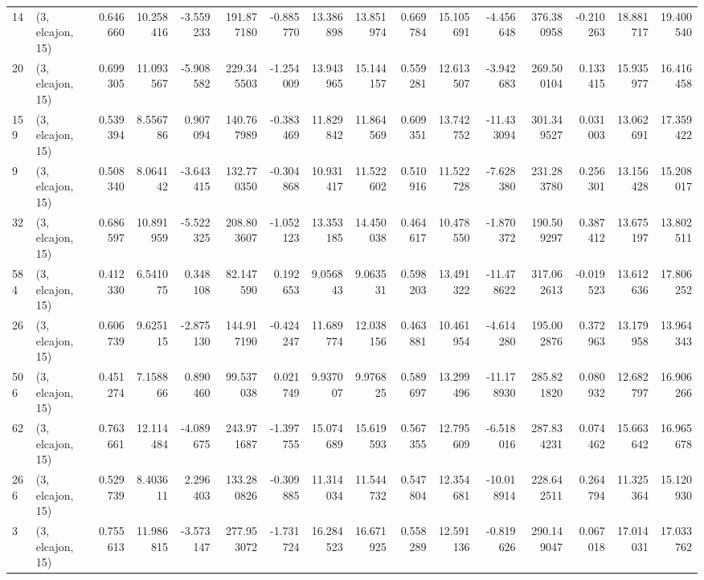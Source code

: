 \begin{tabular}{llrrrrrrrrrrrrrr}
14  &  (3, elcajon, 15) &   0.646660 &  10.258416 &  -3.559233 &   191.877180 &  -0.885770 &  13.386898 &  13.851974 &  0.669784 &  15.105691 &  -4.456648 &   376.380958 & -0.210263 &  18.881717 &  19.400540 \\
20  &  (3, elcajon, 15) &   0.699305 &  11.093567 &  -5.908582 &   229.345503 &  -1.254009 &  13.943965 &  15.144157 &  0.559281 &  12.613507 &  -3.942683 &   269.500104 &  0.133415 &  15.935977 &  16.416458 \\
159 &  (3, elcajon, 15) &   0.539394 &   8.556786 &   0.907094 &   140.767989 &  -0.383469 &  11.829842 &  11.864569 &  0.609351 &  13.742752 & -11.433094 &   301.349527 &  0.031003 &  13.062691 &  17.359422 \\
9   &  (3, elcajon, 15) &   0.508340 &   8.064142 &  -3.643415 &   132.770350 &  -0.304868 &  10.931417 &  11.522602 &  0.510916 &  11.522728 &  -7.628380 &   231.283780 &  0.256301 &  13.156428 &  15.208017 \\
32  &  (3, elcajon, 15) &   0.686597 &  10.891959 &  -5.522325 &   208.803607 &  -1.052123 &  13.353185 &  14.450038 &  0.464617 &  10.478550 &  -1.870372 &   190.509297 &  0.387412 &  13.675197 &  13.802511 \\
584 &  (3, elcajon, 15) &   0.412330 &   6.541075 &   0.348108 &    82.147590 &   0.192653 &   9.056843 &   9.063531 &  0.598203 &  13.491322 & -11.478622 &   317.062613 & -0.019523 &  13.612636 &  17.806252 \\
26  &  (3, elcajon, 15) &   0.606739 &   9.625115 &  -2.875130 &   144.917190 &  -0.424247 &  11.689774 &  12.038156 &  0.463881 &  10.461954 &  -4.614280 &   195.002876 &  0.372963 &  13.179958 &  13.964343 \\
506 &  (3, elcajon, 15) &   0.451274 &   7.158866 &   0.890460 &    99.537038 &   0.021749 &   9.937007 &   9.976825 &  0.589697 &  13.299496 & -11.178930 &   285.821820 &  0.080932 &  12.682797 &  16.906266 \\
62  &  (3, elcajon, 15) &   0.763661 &  12.114484 &  -4.089675 &   243.971687 &  -1.397755 &  15.074689 &  15.619593 &  0.567355 &  12.795609 &  -6.518016 &   287.834231 &  0.074462 &  15.663642 &  16.965678 \\
266 &  (3, elcajon, 15) &   0.529739 &   8.403611 &   2.296403 &   133.280826 &  -0.309885 &  11.314034 &  11.544732 &  0.547804 &  12.354681 & -10.018914 &   228.642511 &  0.264794 &  11.325364 &  15.120930 \\
3   &  (3, elcajon, 15) &   0.755613 &  11.986815 &  -3.573147 &   277.953072 &  -1.731724 &  16.284523 &  16.671925 &  0.558289 &  12.591136 &  -0.819626 &   290.149047 &  0.067018 &  17.014031 &  17.033762 \\

\end{tabular}
